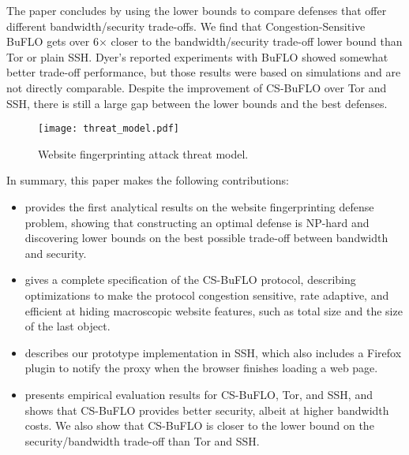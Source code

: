 \documentclass[10pt,journal]{IEEEtran}
\newcommand{\buflo} {BuFLO\xspace}
\newcommand{\csbuflo} {Congestion-Sensitive BuFLO\xspace}
\newcommand{\csb} {CS-BuFLO\xspace}
\begin{document}
The paper concludes by using the lower bounds to compare defenses that
offer different bandwidth/security trade-offs.  We find that \csbuflo
gets over 6$\times$ closer to the bandwidth/security trade-off lower
bound than Tor or plain SSH.  Dyer's reported experiments with \buflo
showed somewhat better trade-off performance, but those results were
based on simulations and are not directly comparable.  Despite the
improvement of \csb over Tor and SSH, there is still a large gap
between the lower bounds and the best defenses.















\begin{figure*}[t]
  \centering
  \texttt{[image: threat\_model.pdf]}
  \caption{\label{fig:threat-model} Website fingerprinting attack threat model.}
\end{figure*}

In summary, this paper makes the following contributions:
\begin{itemize}
  \item {} provides the first analytical results on
    the website fingerprinting defense problem, showing that
    constructing an optimal defense is NP-hard and discovering lower
    bounds on the best possible trade-off between bandwidth and
    security.
  \item {} gives a complete specification of the
    \csb protocol, describing optimizations to make the protocol
    congestion sensitive, rate adaptive, and efficient at hiding
    macroscopic website features, such as total size and the size of
    the last object.
  \item {} describes our prototype
    implementation in SSH, which also includes a Firefox plugin to
    notify the proxy when the browser finishes loading a web page.
  \item {} presents empirical evaluation results
    for \csb, Tor, and SSH, and shows that \csb provides better
    security, albeit at higher bandwidth costs.  We also show that
    \csb is closer to the lower bound on the security/bandwidth
    trade-off than Tor and SSH.
\end{itemize}
\end{document}
